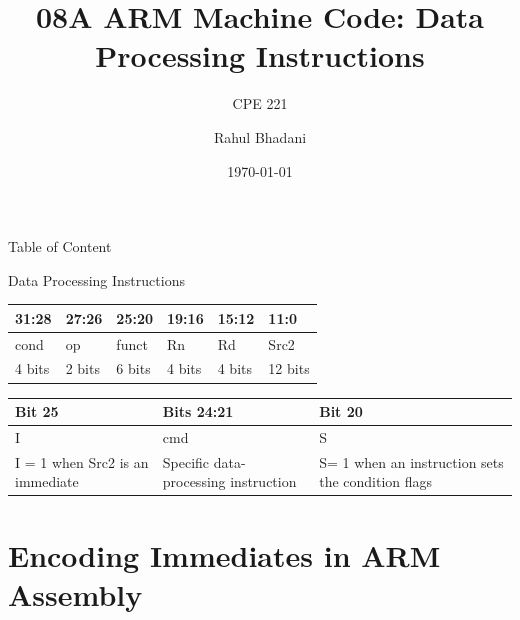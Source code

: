 \documentclass[aspectratio=169]{beamer}
\title{08A ARM Machine Code: Data Processing Instructions}
\subtitle{CPE 221}
\author{Rahul Bhadani}
\institute{The University of Alabama in Huntsville}
\date{\today}
\begin{document}
\begin{frame}

    \titlepage

\end{frame}

\begin{frame}{Table of Content}
    \tableofcontents
\end{frame}


\begin{frame}{Data Processing Instructions}
\begin{center}
    \begin{tabular}{|p{4em}|p{4em}|p{4em}|p{4em}|p{4em}|p{4em}|}
    \hline
    31:28 & 27:26 & 25:20 & 19:16 & 15:12 & 11:0 \\
    \hline
    cond & op & funct & Rn & Rd & Src2 \\
    \hline
    4 bits & 2 bits & 6 bits & 4 bits & 4 bits & 12 bits \\
    \hline
    \end{tabular}

    \vspace{0.5cm}

    \begin{tabular}{|p{11em}|p{11em}|p{11em}|}
        \hline
        Bit 25 & Bits 24:21 & Bit 20\\
        \hline
        I & cmd & S \\
        \hline
        I = 1 when Src2 is an immediate & Specific data-processing instruction & S= 1 when an instruction sets the condition flags\\
        \hline
    \end{tabular}
\end{center}

\end{frame}

\section{Encoding Immediates in ARM Assembly}

\begin{frame}
    \sectionpage
\end{frame}
\end{document}
